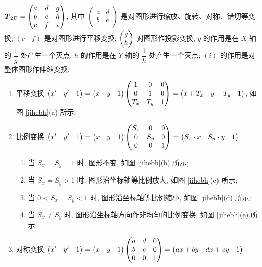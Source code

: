 \begin{theorem}[二维图形的几何变换]
    $\vb*{T}_{2D}=\begin{pmatrix} a & d & g \\ b & e & h \\ c & f & i \\\end{pmatrix}$, 其中 $\begin{pmatrix} a & d \\ b & e \\\end{pmatrix}$ 是对图形进行缩放、旋转、对称、错切等变换; $(c\quad f)$ 是对图形进行平移变换; $\mqty(g\\ h)$ 对图形作投影变换, $g$ 的作用是在 $X$ 轴的 $\dfrac{1}{g}$ 处产生一个灭点, $h$ 的作用是在 $Y$ 轴的 $\dfrac{1}{h}$ 处产生一个灭点; $(i)$ 的作用是对整体图形作伸缩变换.
    \begin{enumerate}[label=(\arabic{*})]
        \item 平移变换 $\mqty(x'&y'&1)=\mqty(x&y&1)\begin{pmatrix} 1 & 0 & 0 \\ 0 & 1 & 0 \\ T_x & T_y & 1 \\\end{pmatrix}=\mqty(x+T_x&y+T_y&1)$, 如图 \ref{jihebh}(a) 所示;
        \item 比例变换 $\mqty(x'&y'&1)=\mqty(x&y&1)\begin{pmatrix} S_x & 0 & 0 \\ 0 & S_y & 0 \\ 0 & 0 & 1 \\\end{pmatrix}=\mqty(S_x\cdot x&S_y\cdot y&1)$ 
        \begin{enumerate}
            \item 当 $S_x=S_y=1$ 时, 图形不变, 如图 \ref{jihebh}(b) 所示;
            \item 当 $S_x=S_y>1$ 时, 图形沿坐标轴等比例放大, 如图 \ref{jihebh}(c) 所示;
            \item 当 $0<S_x=S_y<1$ 时, 图形沿坐标轴等比例缩小, 如图 \ref{jihebh}(d) 所示;
            \item 当 $S_x\neq S_y$ 时, 图形沿坐标轴方向作非均匀的比例变换, 如图 \ref{jihebh}(e) 所示.
        \end{enumerate}
        \item 对称变换 $\mqty(x'&y'&1)=\mqty(x&y&1)\begin{pmatrix} a & d & 0 \\ b & e & 0 \\ 0 & 0 & 1 \\\end{pmatrix}=\mqty(ax+by&dx+ey&1)$ 

\end{enumerate}
\end{theorem}

